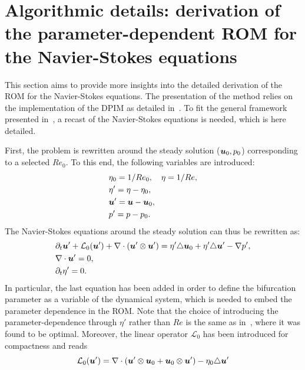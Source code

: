 \documentclass[%
reprint,
superscriptaddress,
 amsmath,amssymb,
 aps,
 pre
]{revtex4-2}
\begin{document}
\section{Algorithmic details: derivation of the parameter-dependent ROM for the Navier-Stokes equations}
\label{sec:detailed_method}

This section aims to provide more insights into the detailed derivation of the ROM for the Navier-Stokes equations. The presentation of the method relies on the implementation of the DPIM as detailed in~\cite{vizza2023superharm,Stabile:follow}. To fit the general framework presented in~\cite{vizza2023superharm,Stabile:follow}, a recast of the Navier-Stokes equations is needed, which is here detailed.

First, the problem is rewritten around the steady solution (${\boldsymbol{u}}_0,p_0$) corresponding to a selected $Re_0$. To this end, the following variables are introduced:
\begin{equation}
\begin{aligned}
    &\eta_0 = 1/Re_0, \quad \eta = 1/Re,\\
    &\eta' = \eta- \eta_0,\\
    & {\boldsymbol{u}}' = {\boldsymbol{u}} - {\boldsymbol{u}}_0,\\
    & p' = p - p_0.
\end{aligned}
\end{equation}
The Navier-Stokes equations around the steady solution can thus be rewritten as:
\begin{subequations}\label{eq:NS-0}
\begin{align}
&
\partial_t {\boldsymbol{u}}' + 
\mathcal{L}_0({\boldsymbol{u}}') +
\nabla \cdot ({\boldsymbol{u}}' \otimes {\boldsymbol{u}}') 
= 
\eta' \triangle {\boldsymbol{u}}_0 +
\eta' \triangle {\boldsymbol{u}}' -
\nabla p', \label{eq:NS-0a}
\\
&
\nabla \cdot {\boldsymbol{u}}' = 0, \label{eq:NS-0b}
\\
&
\partial_t \eta' = 0. \label{eq:NS-0c}
\end{align}
\end{subequations}
In particular, the last equation has been added in order to define the bifurcation parameter as a variable of the dynamical system, which is needed to embed the parameter dependence in the ROM. Note that the choice of introducing the parameter-dependence through $\eta'$ rather than $Re$ is the same as in~\cite{GallairePush}, where it was found to be optimal. Moreover, the linear operator $\mathcal{L}_0$ has been introduced for compactness and reads
\begin{equation}
    \mathcal{L}_0({\boldsymbol{u}}')
    =
    \nabla \cdot 
    ({\boldsymbol{u}}' \otimes {\boldsymbol{u}}_0 +
    {\boldsymbol{u}}_0 \otimes {\boldsymbol{u}}' ) -
    \eta_0 \triangle {\boldsymbol{u}}'
\end{equation}
\end{document}
